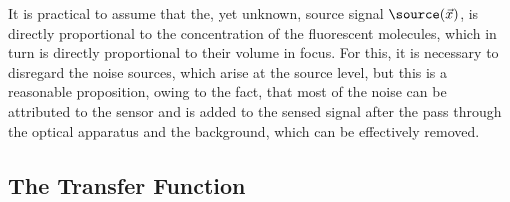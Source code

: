 
It is practical to assume that the, yet unknown, source signal \(\source(\vec{x})\), is directly proportional to the
    concentration of the fluorescent molecules, which in turn is directly proportional to their volume in focus.
For this, it is necessary to disregard the noise sources, which arise at the source level, but this is a reasonable
    proposition, owing to the fact, that most of the noise can be attributed to the sensor and is added to the sensed 
    signal after the pass through the optical apparatus and the background, which can be effectively removed.

\subsection{The Transfer Function}%

